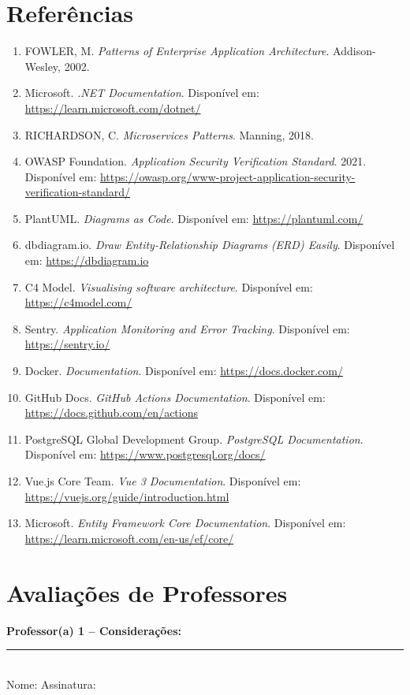 \documentclass[a4paper,12pt]{article}
\begin{document}
\section{Referências}
\begin{enumerate}[nosep]
  \item FOWLER, M. \emph{Patterns of Enterprise Application Architecture}. Addison-Wesley, 2002.
  \item Microsoft. \emph{.NET Documentation}. Disponível em: \url{https://learn.microsoft.com/dotnet/}
  \item RICHARDSON, C. \emph{Microservices Patterns}. Manning, 2018.
  \item OWASP Foundation. \emph{Application Security Verification Standard}. 2021. Disponível em: \url{https://owasp.org/www-project-application-security-verification-standard/}
  \item PlantUML. \emph{Diagrams as Code}. Disponível em: \url{https://plantuml.com/}
  \item dbdiagram.io. \emph{Draw Entity-Relationship Diagrams (ERD) Easily}. Disponível em: \url{https://dbdiagram.io}
  \item C4 Model. \emph{Visualising software architecture}. Disponível em: \url{https://c4model.com/}
  \item Sentry. \emph{Application Monitoring and Error Tracking}. Disponível em: \url{https://sentry.io/}
  \item Docker. \emph{Documentation}. Disponível em: \url{https://docs.docker.com/}
  \item GitHub Docs. \emph{GitHub Actions Documentation}. Disponível em: \url{https://docs.github.com/en/actions}
  \item PostgreSQL Global Development Group. \emph{PostgreSQL Documentation}. Disponível em: \url{https://www.postgresql.org/docs/}
  \item Vue.js Core Team. \emph{Vue 3 Documentation}. Disponível em: \url{https://vuejs.org/guide/introduction.html}
  \item Microsoft. \emph{Entity Framework Core Documentation}. Disponível em: \url{https://learn.microsoft.com/en-us/ef/core/}
\end{enumerate}

\newpage
\section*{Avaliações de Professores}
\noindent\textbf{Professor(a) 1 – Considerações:}\\[3cm]
\noindent\rule{\linewidth}{0.5pt}\\
\noindent Nome: \hfill Assinatura: \hspace{4cm}
\end{document}
